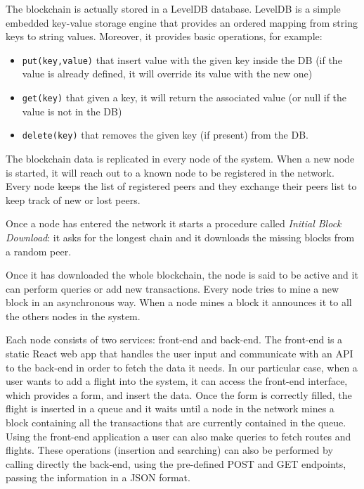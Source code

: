 \documentclass[11pt]{scrartcl} %
\begin{document}
The blockchain is actually stored in a LevelDB database. LevelDB is a simple embedded key-value storage engine that provides an ordered mapping from string keys to string values. Moreover, it provides basic operations, for example:
\begin{itemize}
\item[\adforn{43}] \texttt{put(key,value)} that insert value with the given key inside the DB (if the value is already defined, it will override its value with the new one)
\item[\adforn{43}] \texttt{get(key)} that given a key, it will return the associated value (or null if the value is not in the DB)
\item[\adforn{43}] \texttt{delete(key)} that removes the given key (if present) from  the DB.
\end{itemize}

The blockchain data is replicated in every node of the system. When a new node is started, it will reach out to a known node to be registered in the network. Every node keeps the list of registered peers and they exchange their peers list to keep track of new or lost peers.

Once a node has entered the network it starts a procedure called \textit{Initial Block Download}: it asks for the longest chain and it downloads the missing blocks from a random peer.

Once it has downloaded the whole blockchain, the node is said to be active and it can perform queries or add new transactions. Every node tries to mine a new block in an asynchronous way. When a node mines a block it announces it to all the others nodes in the system.

Each node consists of two services: front-end and back-end. The front-end is a static React web app that handles the user input and communicate with an API to the back-end in order to fetch the data it needs. In our particular case, when a user wants to add a flight into the system, it can access the front-end interface, which provides a form, and insert the data. Once the form is correctly filled, the flight is inserted in a queue and it waits until a node in the network mines a block containing all the transactions that are currently contained in the queue. Using the front-end application a user can also make queries to fetch routes and flights. These operations (insertion and searching) can also be performed by calling directly the back-end, using the pre-defined POST and GET endpoints, passing the information in a JSON format.
\end{document}
